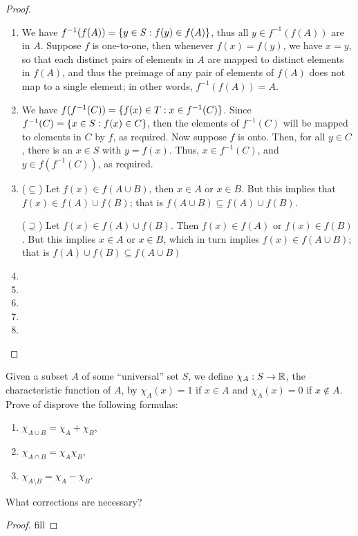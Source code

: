 \begin{proof}
\begin{enumerate}
    \item We have $f^{-1}(f(A))=\{y\in S: f(y)\in f(A)\}$, thus all $y\in f^{-1}(f(A))$ are in $A$.
    Suppose $f$ is one-to-one, then whenever $f(x)=f(y)$, we have $x=y$, so that each distinct pairs of elements in $A$ are mapped to distinct elements in $f(A)$, and thus the preimage of any pair of elements of $f(A)$ does not map to a single element;
    in other words, $f^{-1}(f(A))=A$.
    
    \item We have $f(f^{-1}(C))=\{f(x)\in T: x\in f^{-1}(C)\}$.
    Since $f^{-1}(C)=\{x\in S: f(x)\in C\}$, then the elements of $f^{-1}(C)$ will be mapped to elements in $C$ by $f$, as required.
    Now suppose $f$ is onto.
    Then, for all $y\in C$, there is an $x\in S$ with $y=f(x)$.
    Thus, $x\in f^{-1}(C)$, and $y\in f(f^{-1}(C))$, as required.
    
    \item ($\subseteq$)
    Let $f(x)\in f(A\cup B)$, then $x\in A$ or $x\in B$.
    But this implies that $f(x)\in f(A)\cup f(B)$;
    that is $f(A\cup B)\subseteq f(A)\cup f(B)$.

    ($\supseteq$)
    Let $f(x)\in f(A)\cup f(B)$.
    Then $f(x)\in f(A)$ or $f(x)\in f(B)$.
    But this implies $x\in A$ or $x\in B$, which in turn implies $f(x)\in f(A\cup B)$;
    that is $f(A)\cup f(B)\subseteq f(A\cup B)$
    
    \item
    \item 
    \item 
    \item 
    \item
\end{enumerate}
\end{proof} 

\begin{exercise}{2}
Given a subset $A$ of some ``universal'' set $S$, we define $\chi_A:S\to\mathbb{R}$, the characteristic function of $A$, by $\chi_A(x)=1$ if $x\in A$ and $\chi_A(x)=0$ if $x\notin A$.
Prove of disprove the following formulas:
\begin{enumerate}
    \item $\chi_{A\cup B}=\chi_A +\chi_B$,
    \item $\chi_{A\cap B}=\chi_A \chi_B$,
    \item $\chi_{A\setminus B}=\chi_A-\chi_B$.
\end{enumerate}
What corrections are necessary?
\end{exercise}
\begin{proof}
fill
\end{proof} 

